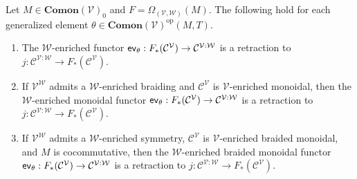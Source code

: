 \begin{thm}
    \label{Thm:Retract}
    Let $M \in \mathbf{Comon}( \mathcal{V} )_0$ and $F = \Omega_{(\mathcal{V},\mathcal{W})}( M )$.
    The following hold for each generalized element $\theta \in \mathbf{Comon}( \mathcal{V} )^{\text{op}}( M, T )$.
    \begin{enumerate}
    \item The $\mathcal{W}$-enriched functor $\mathsf{ev}_\theta: F_*( \mathcal{C}^{\mathcal{V}} ) \to \mathcal{C}^{\mathcal{V}:\mathcal{W}}$ is a retraction to $j: \mathcal{C}^{\mathcal{V}:\mathcal{W}} \to F_*( \mathcal{C}^{\mathcal{V}} )$.
    \item If $\mathcal{V}^{\mathcal{W}}$ admits a $\mathcal{W}$-enriched braiding and $\mathcal{C}^{\mathcal{V}}$ is $\mathcal{V}$-enriched monoidal, then the $\mathcal{W}$-enriched monoidal functor $\mathsf{ev}_\theta: F_*( \mathcal{C}^{\mathcal{V}} ) \to \mathcal{C}^{\mathcal{V}:\mathcal{W}}$ is a retraction to $j: \mathcal{C}^{\mathcal{V}:\mathcal{W}} \to F_*( \mathcal{C}^{\mathcal{V}} )$.
    \item If $\mathcal{V}^{\mathcal{W}}$ admits a $\mathcal{W}$-enriched symmetry, $\mathcal{C}^{\mathcal{V}}$ is $\mathcal{V}$-enriched braided monoidal, and $M$ is cocommutative, then the $\mathcal{W}$-enriched braided monoidal functor $\mathsf{ev}_\theta: F_*( \mathcal{C}^{\mathcal{V}} ) \to \mathcal{C}^{\mathcal{V}:\mathcal{W}}$ is a retraction to $j: \mathcal{C}^{\mathcal{V}:\mathcal{W}} \to F_*( \mathcal{C}^{\mathcal{V}} )$.
    \end{enumerate}
\end{thm}

